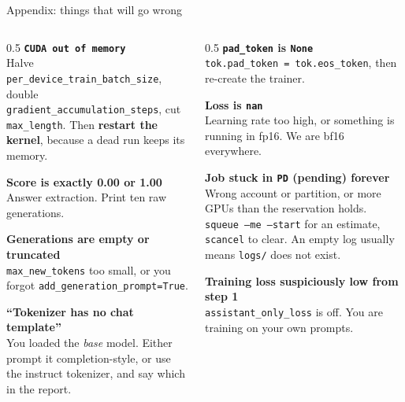 \documentclass[aspectratio=169,10pt]{beamer}
\begin{document}
\appendix

\begin{frame}[shrink=14]{Appendix: things that will go wrong}
  \begin{columns}[T]
    \begin{column}{0.5\textwidth}
      \small
      \textbf{\texttt{CUDA out of memory}}\\
      Halve \texttt{per\_device\_train\_batch\_size}, double
      \texttt{gradient\_accumulation\_steps}, cut \texttt{max\_length}.
      Then \textbf{restart the kernel}, because a dead run keeps its memory.
      \vspace{0.4em}

      \textbf{Score is exactly 0.00 or 1.00}\\
      Answer extraction. Print ten raw generations.
      \vspace{0.4em}

      \textbf{Generations are empty or truncated}\\
      \texttt{max\_new\_tokens} too small, or you forgot
      \texttt{add\_generation\_prompt=True}.
      \vspace{0.4em}

      \textbf{``Tokenizer has no chat template''}\\
      You loaded the \emph{base} model. Either prompt it completion-style, or
      use the instruct tokenizer, and say which in the report.
    \end{column}
    \begin{column}{0.5\textwidth}
      \small
      \textbf{\texttt{pad\_token} is \texttt{None}}\\
      \texttt{tok.pad\_token = tok.eos\_token}, then re-create the trainer.
      \vspace{0.4em}

      \textbf{Loss is \texttt{nan}}\\
      Learning rate too high, or something is running in fp16. We are bf16
      everywhere.
      \vspace{0.4em}

      \textbf{Job stuck in \texttt{PD} (pending) forever}\\
      Wrong account or partition, or more GPUs than the reservation holds.
      \texttt{squeue --me --start} for an estimate, \texttt{scancel} to clear.
      An empty log usually means \texttt{logs/} does not exist.
      \vspace{0.4em}

      \textbf{Training loss suspiciously low from step 1}\\
      \texttt{assistant\_only\_loss} is off. You are training on your own prompts.
    \end{column}
  \end{columns}
\end{frame}
\end{document}
